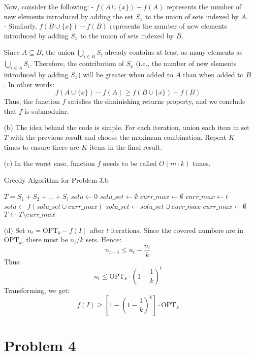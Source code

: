 \documentclass{article}
\begin{document}
Now, consider the following:
- $f(A \cup \{x\}) - f(A)$ represents the number of new elements introduced by adding the set $S_x$ to the union of sets indexed by $A$.
- Similarly, $f(B \cup \{x\}) - f(B)$ represents the number of new elements introduced by adding $S_x$ to the union of sets indexed by $B$.

Since $A \subseteq B$, the union $\bigcup_{i \in B} S_i$ already contains at least as many elements as $\bigcup_{i \in A} S_i$. Therefore, the contribution of $S_x$ (i.e., the number of new elements introduced by adding $S_x$) will be greater when added to $A$ than when added to $B$. In other words:
\[
f(A \cup \{x\}) - f(A) \geq f(B \cup \{x\}) - f(B)
\]
Thus, the function $f$ satisfies the diminishing returns property, and we conclude that $f$ is submodular.


(b) The idea behind the code is simple. For each iteration, union each item in set \( T \) with the previous result and choose the maximum combination. Repeat \( K \) times to ensure there are \( K \) items in the final result.

(c) In the worst case, function \( f \) needs to be called \( O(m \cdot k) \) times.

\begin{algorithm}
\caption{Greedy Algorithm for Problem 3.b}
\begin{algorithmic}
\State $T = S_1 + S_2 + ... + S_i$
\State $solu \gets 0$
\State $solu\_set \gets \emptyset$
\State $curr\_max \gets \emptyset$
            \State $curr\_max \gets t$
        \EndIf
    \EndFor
    \State $solu \gets f(solu\_set \cup curr\_max)$
    \State $solu\_set \gets solu\_set \cup curr\_max$
    \State $curr\_max \gets \emptyset$
    \State $T \gets T \setminus curr\_max$
\EndFor
\end{algorithmic}
\end{algorithm}

(d) Set \( n_t = \text{OPT}_k - f(I) \) after \( t \) iterations. Since the covered numbers are in \( \text{OPT}_k \), there must be \( n_t/k \) sets. Hence:
\[
n_{t+1} \leq n_t - \frac{n_t}{k}
\]
Thus:
\[
n_t \leq \text{OPT}_k \cdot \left(1 - \frac{1}{k}\right)^t
\]
Transforming, we get:
\[
f(I) \geq \left[1 - \left(1 - \frac{1}{k}\right)^k\right] \cdot \text{OPT}_k
\]

\section*{Problem 4}
\end{document}
